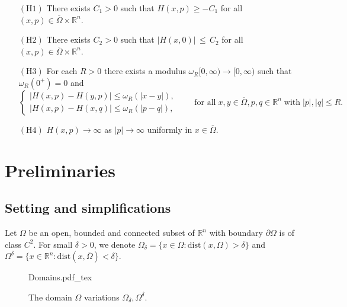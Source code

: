 \documentclass[11pt,reqno]{amsart}
\numberwithin{figure}{section}
\theoremstyle{plain}
\theoremstyle{remark}
\numberwithin{equation}{section}
\newcommand{\incfig}[1]{%
    \def\svgwidth{\columnwidth}
    {#1.pdf_tex}
}
\begin{document}
\begin{itemize}
    \item[$\mathrm{(H1)}$] There exists $C_1 > 0$ such that $H(x,p) \geq -C_1$ for all $(x,p)\in \overline{\Omega}\times\mathbb{R}^n$.
    \item[$\mathrm{(H2)}$] There exists $C_2>0$ such that $|H(x,0)|\,\leq \,C_2$ for all $(x,p)\in \overline{\Omega}\times \mathbb{R}^n$.
    \item[$\mathrm{(H3)}$] For each $R>0$ there exists a modulus $\omega_{R}[0,\infty)\to [0,\infty)$ such that $\omega_R(0^+) = 0$ and 
    \begin{equation*}
        \begin{cases}
        |H(x,p) - H(y,p)| \leq \omega_R(|x-y|),\\
        |H(x,p) - H(x,q)| \leq \omega_R(|p-q|),
        \end{cases} \qquad\text{for all}\;x,y\in \overline{\Omega}, p,q \in \mathbb{R}^n\;\text{with}\;|p|,|q|\leq R.
    \end{equation*}
    \item[$\mathrm{(H4)}$] $H(x,p)\rightarrow \infty$ as $|p|\to \infty$ uniformly in $x\in \overline{\Omega}$.
\end{itemize}

\section{Preliminaries}\label{sec:prelim} 
\subsection{Setting and simplifications} Let $\Omega$ be an open, bounded and connected subset of $\mathbb{R}^n$ with boundary $\partial\Omega$ is of class $C^2$. For small $\delta>0$, we denote $\Omega_\delta = \{x\in \Omega: \mathrm{dist}(x,\Omega) > \delta\}$ and $\Omega^\delta = \{x\in \mathbb{R}^n: \mathrm{dist}(x,\overline{\Omega}) < \delta\}$. 
\begin{figure}[ht]
    \centering
    \def\svgwidth{0.47\columnwidth}
    {Domains.pdf_tex}
    \caption{The domain $\Omega$ variations $\Omega_\delta, \Omega^\delta$.}
    \label{fig:Domains}
\end{figure}
\end{document}
